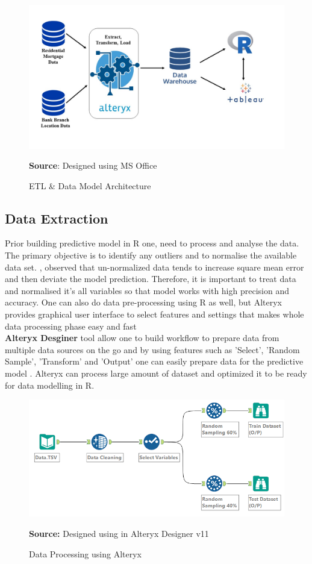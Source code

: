 \begin{figure}
\centering
\includegraphics[width=\textwidth]{ETL.jpg}
\caption{ETL \& Data Model Architecture}{\textbf{Source}: Designed using MS Office}
\end{figure}


\subsection{Data Extraction} Prior building predictive model in R one, need to process and analyse the data. The primary objective is to identify any outliers and to normalise the available data set. \cite{sola1997importance}, observed that un-normalized data tends to increase square mean error and then deviate the model prediction. Therefore, it is important to treat data and normalised it's all variables so that model works with high precision and accuracy. One can also do data pre-processing using R as well, but Alteryx provides graphical user interface to select features and settings that makes whole data processing phase easy and fast\\

\textbf{Alteryx Desginer} tool allow one to build workflow to prepare data from multiple data sources on the go and by using features such as 'Select', 'Random Sample', 'Transform' and 'Output' one can easily prepare data for the predictive model \citep{dinsmore2016self}. Alteryx can process large amount of dataset and optimized it to be ready for data modelling in R.

\begin{center}
\begin{figure}[ht]
\includegraphics[width=\textwidth]{dataprocess.png}
\centering
\caption{Data Processing using Alteryx}{\textbf{Source:} Designed using in Alteryx Designer v11}
\label{fig:dataprocessing}
\end{figure}
\end{center}

